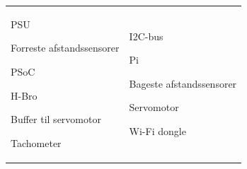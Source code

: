 \begin{table}[h]
\begin{tabularx}{\textwidth}{Z Z}
\begin{packed_enum}
\item PSU
\item Forreste afstandssensorer
\item PSoC
\item H-Bro
\item Buffer til servomotor
\item Tachometer
\end{packed_enum}
&
\begin{packed_enum}
\setcounter{enumi}{6}
\item I2C-bus
\item Pi
\item Bageste afstandssensorer
\item Servomotor
\item Wi-Fi dongle
\end{packed_enum}
\end{tabularx}
\end{table}
